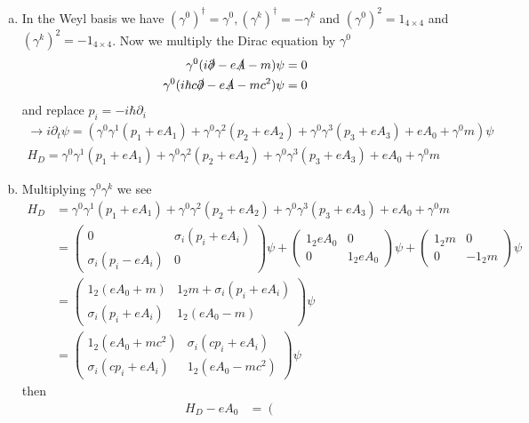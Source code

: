 \documentclass[../main.tex]{subfiles}
\begin{document}
\begin{enumerate}[(a)]
\item In the Weyl basis we have  $(\gamma^0)^\dagger=\gamma^0, (\gamma^k)^\dagger=-\gamma^k$ and $(\gamma^0)^2=1_{4\times4}$ and $(\gamma^k)^2=-1_{4\times4}$. Now we multiply the Dirac equation by $\gamma^0$
\begin{align}
\gamma^0(i\slashed{\partial}-e\slashed{A}-m)\psi=0\\
\gamma^0(i\hbar c\slashed{\partial}-e\slashed{A}-mc^2)\psi=0
\end{align}
and replace $p_i=-i\hbar\partial_i$
\begin{align}
\rightarrow i\partial_t\psi=(
\gamma^0\gamma^1(p_1+eA_1)+
\gamma^0\gamma^2(p_2+eA_2)+
\gamma^0\gamma^3(p_3+eA_3)+eA_0+\gamma^0m)\psi\\
H_D=
\gamma^0\gamma^1(p_1+eA_1)+
\gamma^0\gamma^2(p_2+eA_2)+
\gamma^0\gamma^3(p_3+eA_3)+eA_0+\gamma^0m
\end{align}
\item Multiplying $\gamma^0\gamma^k$ we see
\begin{align}
H_D&=
\gamma^0\gamma^1(p_1+eA_1)+
\gamma^0\gamma^2(p_2+eA_2)+
\gamma^0\gamma^3(p_3+eA_3)+eA_0+\gamma^0m\\
&=\left(\begin{array}{cc}
0&\sigma_i(p_i+eA_i)\\
\sigma_i(p_i-eA_i)&0
\end{array}
\right)\psi
+\left(\begin{array}{cc}
1_2eA_0&0\\
0&1_2eA_0
\end{array}
\right)\psi
+\left(\begin{array}{cc}
1_2m&0\\
0&-1_2m
\end{array}
\right)\psi\\
&=\left(\begin{array}{cc}
1_2(eA_0+m)&1_2m+\sigma_i(p_i+eA_i)\\
\sigma_i(p_i+eA_i)&1_2(eA_0-m)
\end{array}
\right)\psi\\
&=\left(\begin{array}{cc}
1_2(eA_0+mc^2)&\sigma_i(cp_i+eA_i)\\
\sigma_i(cp_i+eA_i)&1_2(eA_0-mc^2)
\end{array}
\right)\psi
\end{align}
then
\begin{align}
H_D-eA_0&=\left(\begin{array}{cc}

\end{array}
\end{align}
\end{enumerate}
\end{document}
